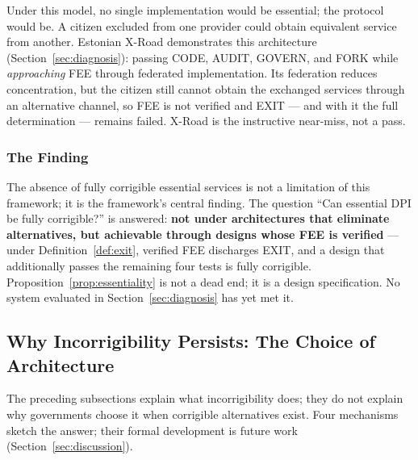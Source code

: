 \documentclass{article}
\begin{document}
Under this model, no single implementation would be essential; the protocol would be. A citizen excluded from one provider could obtain equivalent service from another. Estonian X-Road demonstrates this architecture (Section~\ref{sec:diagnosis}): passing CODE, AUDIT, GOVERN, and FORK while \emph{approaching} FEE through federated implementation. Its federation reduces concentration, but the citizen still cannot obtain the exchanged services through an alternative channel, so FEE is not verified and EXIT --- and with it the full determination --- remains failed. X-Road is the instructive near-miss, not a pass.

\subsubsection{The Finding}

The absence of fully corrigible essential services is not a limitation of this framework; it is the framework's central finding. The question ``Can essential DPI be fully corrigible?'' is answered: \textbf{not under architectures that eliminate alternatives, but achievable through designs whose FEE is verified} --- under Definition~\ref{def:exit}, verified FEE discharges EXIT, and a design that additionally passes the remaining four tests is fully corrigible. Proposition~\ref{prop:essentiality} is not a dead end; it is a design specification. No system evaluated in Section~\ref{sec:diagnosis} has yet met it.

\subsection{Why Incorrigibility Persists: The Choice of Architecture}
\label{subsec:architecture-choice}

The preceding subsections explain what incorrigibility does; they do not explain why governments choose it when corrigible alternatives exist. Four mechanisms sketch the answer; their formal development is future work (Section~\ref{sec:discussion}).
\end{document}
